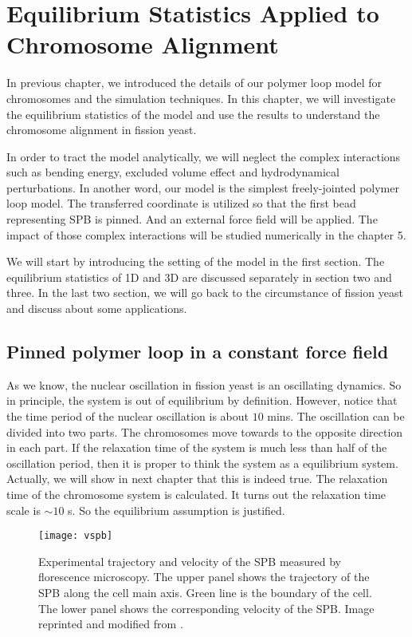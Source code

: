 \chapter{Equilibrium Statistics Applied to Chromosome Alignment}
\graphicspath{{Chapter3/Figs/}}

In previous chapter, we introduced the details of our polymer loop model for chromosomes and the simulation techniques. In this chapter, we will investigate the equilibrium statistics of the model and use the results to understand the chromosome alignment in fission yeast. 

In order to tract the model analytically, we will neglect the complex interactions such as bending energy, excluded volume effect and hydrodynamical perturbations. In another word, our model is the simplest freely-jointed polymer loop model. The transferred coordinate is utilized so that the first bead representing SPB is pinned. And an external force field will be applied. The impact of those complex interactions will be studied numerically in the chapter 5. 

We will start by introducing the setting of the model in the first section. The equilibrium statistics of 1D and 3D are discussed separately in section two and three. In the last two section, we will go back to the circumstance of fission yeast and discuss about some applications. 


\section{Pinned polymer loop in a constant force field}
\label{sec:pinned_polymer_loop}
As we know, the nuclear oscillation in fission yeast is an oscillating dynamics. So in principle, the system is out of equilibrium by definition. However, notice that the time period of the nuclear oscillation is about $10$ mins. The oscillation can be divided into two parts. The chromosomes move towards to the opposite direction in each part. If the relaxation time of the system is much less than half of the oscillation period, then it is proper to think the system as a equilibrium system. Actually, we will show in next chapter that this is indeed true. The relaxation time of the chromosome system is calculated. It turns out the relaxation time scale is $\sim10$ s. So the equilibrium assumption is justified. 

\begin{figure}[htpb]
    \centering
    \texttt{[image: vspb]}
    \caption{Experimental trajectory and velocity of the SPB measured by florescence microscopy. The upper panel shows the trajectory of the SPB along the cell main axis. Green line is the boundary of the cell. The lower panel shows the corresponding velocity of the SPB. Image reprinted and modified from \cite{Vogel2009}.}
    \label{fig:vspb}
\end{figure}

